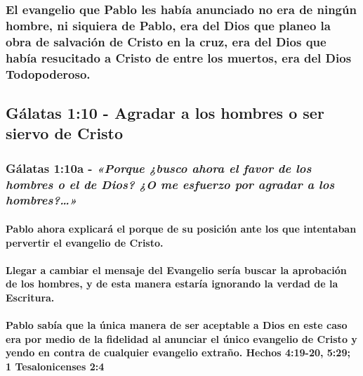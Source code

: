 \documentclass[11a pt,twoside]{article}
\newcommand{\scripture}[1]{%
  {\fontsize{12pt}{16pt}\selectfont\ScriptureFont\itshape #1}%
}
\let\oldsubsection\subsection
\renewcommand{\subsection}{\needspace{5\baselineskip}\oldsubsection}
\let\oldsubsubsection\subsubsection
\renewcommand{\subsubsection}{\needspace{4\baselineskip}\oldsubsubsection}
\let\oldparagraph\paragraph
\renewcommand{\paragraph}{\needspace{3\baselineskip}\oldparagraph}
\begin{document}
\subsubsection{El evangelio que Pablo les había anunciado no era de
ningún hombre, ni siquiera de Pablo, era del Dios que planeo la obra de
salvación de Cristo en la cruz, era del Dios que había resucitado a
Cristo de entre los muertos, era del Dios
Todopoderoso.}\label{el-evangelio-que-pablo-les-habuxeda-anunciado-no-era-de-ninguxfan-hombre-ni-siquiera-de-pablo-era-del-dios-que-planeo-la-obra-de-salvaciuxf3n-de-cristo-en-la-cruz-era-del-dios-que-habuxeda-resucitado-a-cristo-de-entre-los-muertos-era-del-dios-todopoderoso.}

\subsection{Gálatas 1:10 - Agradar a los hombres o ser siervo de
Cristo}\label{guxe1latas-110---agradar-a-los-hombres-o-ser-siervo-de-cristo}

\subsubsection{\texorpdfstring{Gálatas 1:10a -
\scripture{«Porque ¿busco ahora el favor de los hombres o el de Dios? ¿O me esfuerzo por agradar a los hombres?…»}}{Gálatas 1:10a - }}\label{guxe1latas-110a---porque-busco-ahora-el-favor-de-los-hombres-o-el-de-dios-o-me-esfuerzo-por-agradar-a-los-hombres}

\paragraph{Pablo ahora explicará el porque de su posición ante los que
intentaban pervertir el evangelio de
Cristo.}\label{pablo-ahora-explicaruxe1-el-porque-de-su-posiciuxf3n-ante-los-que-intentaban-pervertir-el-evangelio-de-cristo.}

\paragraph{Llegar a cambiar el mensaje del Evangelio sería buscar la
aprobación de los hombres, y de esta manera estaría ignorando la verdad
de la
Escritura.}\label{llegar-a-cambiar-el-mensaje-del-evangelio-seruxeda-buscar-la-aprobaciuxf3n-de-los-hombres-y-de-esta-manera-estaruxeda-ignorando-la-verdad-de-la-escritura.}

\paragraph{Pablo sabía que la única manera de ser aceptable a Dios en
este caso era por medio de la fidelidad al anunciar el único evangelio
de Cristo y yendo en contra de cualquier evangelio extraño. Hechos
4:19-20, 5:29; 1 Tesalonicenses
2:4}\label{pablo-sabuxeda-que-la-uxfanica-manera-de-ser-aceptable-a-dios-en-este-caso-era-por-medio-de-la-fidelidad-al-anunciar-el-uxfanico-evangelio-de-cristo-y-yendo-en-contra-de-cualquier-evangelio-extrauxf1o.-hechos-419-20-529-1-tesalonicenses-24}
\end{document}
